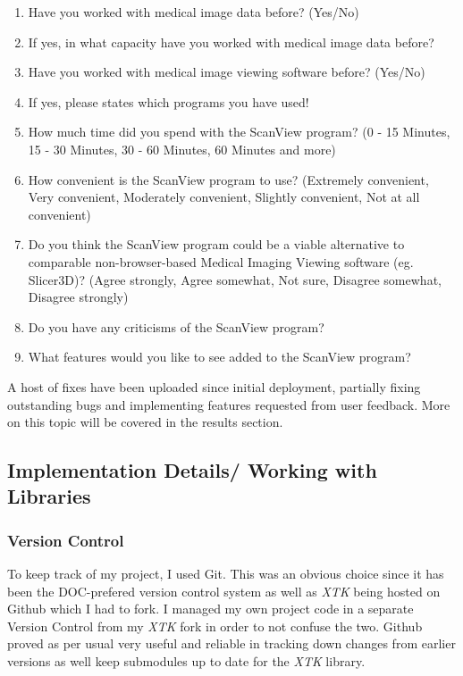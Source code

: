 \documentclass[a4paper,11pt,twoside]{article}
\begin{document}
\begin{enumerate}
\item Have you worked with medical image data before? (Yes/No)
\item If yes, in what capacity have you worked with medical image data before?
\item Have you worked with medical image viewing software before? (Yes/No)
\item If yes, please states which programs you have used!
\item How much time did you spend with the ScanView program? (0 - 15 Minutes, 15 - 30 Minutes, 30 - 60 Minutes, 60 Minutes and more)
\item How convenient is the ScanView program to use? (Extremely convenient, Very convenient, Moderately convenient, Slightly convenient, Not at all convenient)
\item Do you think the ScanView program could be a viable alternative to comparable non-browser-based Medical Imaging Viewing software (eg. Slicer3D)? (Agree strongly, Agree somewhat, Not sure, Disagree somewhat, Disagree strongly)
\item Do you have any criticisms of the ScanView program?
\item What features would you like to see added to the ScanView program?
\end{enumerate}





A host of fixes have been uploaded since initial deployment, partially fixing outstanding bugs and implementing features requested from user feedback. More on this topic will be covered in the results section.





\subsection{Implementation Details/ Working with Libraries}

\subsubsection{Version Control}

To keep track of my project, I used Git. This was an obvious choice since it has been the DOC-prefered version control system as well as \textit{XTK} being hosted on Github which I had to fork. I managed my own project code in a separate Version Control from my \textit{XTK} fork in order to not confuse the two. Github proved as per usual very useful and reliable in tracking down changes from earlier versions as well keep submodules up to date for the \textit{XTK} library. 
\end{document}
